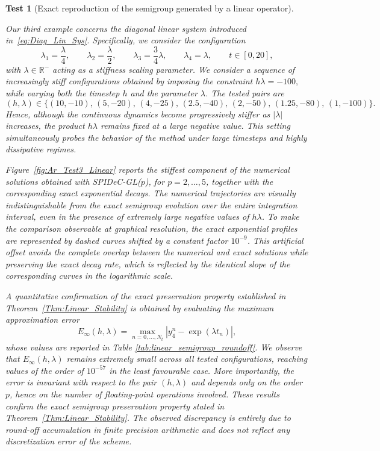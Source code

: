 \documentclass[a4paper,num-refs]{oup-contemporary-spidec}
\newtheorem{testcase}{Test} %
\begin{document}
\begin{testcase}[Exact reproduction of the semigroup generated by a linear operator]\label{test:Linear}

Our third example concerns the diagonal linear system introduced in~\eqref{eq:Diag_Lin_Sys}. Specifically, we consider the configuration
\begin{equation*}
    \lambda_1=\dfrac{\lambda}{4}, \qquad 
    \lambda_2=\dfrac{\lambda}{2}, \qquad 
    \lambda_3=\dfrac{3}{4}\lambda, \qquad 
    \lambda_4=\lambda, \qquad t\in [0,20],
\end{equation*}
with $\lambda\in\mathbb{R}^-$ acting as a stiffness scaling parameter. We consider a sequence of increasingly stiff configurations obtained by imposing the constraint $h\lambda=-100,$
while varying both the timestep $h$ and the parameter $\lambda$. 
The tested pairs are
\[
    (h,\lambda)\in
    \{(10,-10),\, (5,-20), \, (4,-25), \, (2.5,-40),\, 
    (2,-50), \, (1.25,-80), \, (1,-100)\}.
\]
Hence, although the continuous dynamics become progressively stiffer as $|\lambda|$ increases, the product $h\lambda$ remains fixed at a large negative value. This setting simultaneously probes the behavior of the method under large timesteps and highly dissipative regimes.

Figure~\ref{fig:Ar_Test3_Linear} reports the stiffest component of the numerical solutions obtained with SPIDeC-GL($p$), for $p=2,\dots,5$, together with the corresponding exact exponential decays. The numerical trajectories are visually indistinguishable from the exact semigroup evolution over the entire integration interval, even in the presence of extremely large negative values of $h\lambda$. To make the comparison observable at graphical resolution, the exact exponential profiles are represented by dashed curves shifted by a constant factor $10^{-9}$. This artificial offset avoids the complete overlap between the numerical and exact solutions while preserving the exact decay rate, which is reflected by the identical slope of the corresponding curves in the logarithmic scale.

A quantitative confirmation of the exact preservation property established in Theorem~\ref{Thm:Linear_Stability} is obtained by evaluating the maximum approximation error
\begin{equation*}
     E_\infty(h,\lambda)
    =
    \max_{n=0,\dots,N_t}
    \left|
        y_4^n-\exp(\lambda t_n)
    \right|,
\end{equation*}
whose values are reported in Table \ref{tab:linear_semigroup_roundoff}. We observe that $E_\infty(h,\lambda)$ remains extremely small across all tested configurations, reaching values of the order of $10^{-57}$ in the least favourable case. More importantly, the error is invariant with respect to the pair $(h,\lambda)$ and depends only on the order $p$, hence on the number of floating-point operations involved. These results confirm the exact semigroup preservation property stated in Theorem~\ref{Thm:Linear_Stability}. The observed discrepancy is entirely due to round-off accumulation in finite precision arithmetic and does not reflect any discretization error of the scheme.


\end{testcase}
\end{document}
